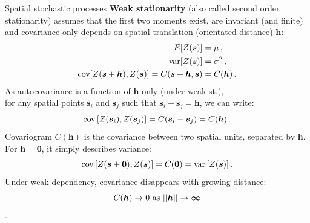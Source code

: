 \documentclass{beamer}
\begin{document}
\begin{frame}{Spatial stochastic processes}
\vspace{-0.2cm}
\textbf{Weak  stationarity} (also called second order stationarity) assumes that the first two moments exist, are invariant (and finite) and covariance only depends on spatial translation (orientated distance) $\bm{h}$:
\begin{equation*}
\begin{aligned}  
E[Z(\bm{s})] &= \mu \,, \\
\textnormal{var}[Z(\bm{s})] & = \sigma^2 \,, \\
\textnormal{cov} [Z(\bm{s}+\bm{h}),Z(\bm{s})] = C(\bm{s}+\bm{h}, \bm{s}) & = C(\bm{h}) \,.
\end{aligned} 
\end{equation*}
As autocovariance is a function of $\bm{h}$ only (under weak st.), \\for any spatial points $\bm{s}_i$ and $\bm{s}_j$ such that $\bm{s}_i -\bm{s}_j = \bm{h}$, we can write: 
\begin{equation*}
\textnormal{cov} \left[ Z(\bm{s}_i), Z(\bm{s}_j) \right] = C(\bm{s}_i - \bm{s}_j) = C(\bm{h}) \,.  
\end{equation*}
Covariogram $C(\bm{h})$ is the covariance between two spatial units, separated by $\bm{h}$. For $\bm{h} = \bm{0}$, it simply describes variance: 
$$\textnormal{cov}\,[Z(\bm{s}+\bm{0}),Z(\bm{s})] =  C(\bm{0}) = \textnormal{var}\,[Z(\bm{s})]\,.$$
Under weak dependency, covariance disappears with growing distance: 
$$C(\bm{h}) \rightarrow 0~\textnormal{as}~||\bm{h}|| \rightarrow \bm{\infty}$$.
\end{frame}
\end{document}
